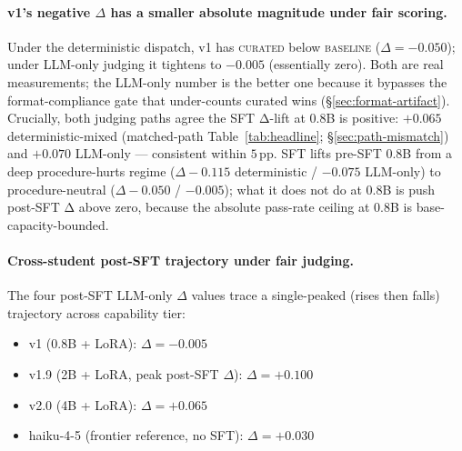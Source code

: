 \documentclass[10pt]{article}
\newcommand{\BL}{\textsc{baseline}\xspace}
\newcommand{\CU}{\textsc{curated}\xspace}
\begin{document}
\paragraph{v1's negative $\Delta$ has a smaller absolute magnitude under fair scoring.} Under the deterministic dispatch, v1 has \CU{} below \BL{} ($\Delta = -0.050$); under LLM-only judging it tightens to $-0.005$ (essentially zero). Both are real measurements; the LLM-only number is the better one because it bypasses the format-compliance gate that under-counts curated wins (\S\ref{sec:format-artifact}). Crucially, both judging paths agree the SFT Δ-lift at 0.8B is positive: $+0.065$ deterministic-mixed (matched-path Table~\ref{tab:headline}; \S\ref{sec:path-mismatch}) and $+0.070$ LLM-only --- consistent within $5$\,pp. SFT lifts pre-SFT 0.8B from a deep procedure-hurts regime ($\Delta -0.115$ deterministic / $-0.075$ LLM-only) to procedure-neutral ($\Delta -0.050$ / $-0.005$); what it does not do at 0.8B is push post-SFT Δ above zero, because the absolute pass-rate ceiling at 0.8B is base-capacity-bounded.

\paragraph{Cross-student post-SFT trajectory under fair judging.} The four post-SFT LLM-only $\Delta$ values trace a single-peaked (rises then falls) trajectory across capability tier:
\begin{itemize}[leftmargin=*, nosep]
  \item v1   (0.8B + LoRA): $\Delta = -0.005$
  \item v1.9 (2B  + LoRA, peak post-SFT $\Delta$): $\Delta = +0.100$
  \item v2.0 (4B  + LoRA): $\Delta = +0.065$
  \item haiku-4-5 (frontier reference, no SFT): $\Delta = +0.030$
\end{itemize}
\end{document}

